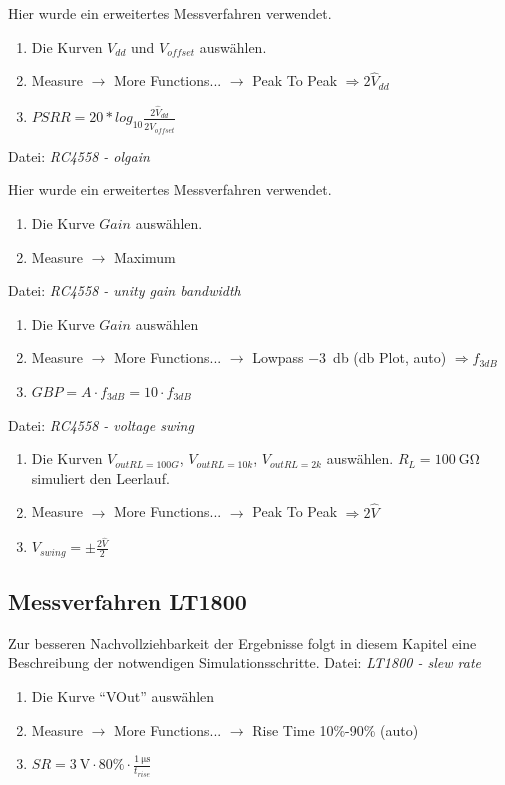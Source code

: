 \documentclass[
	ngerman,
	parskip=half,
	twocolumn,
	DIV=calc,
	]{scrartcl}
\begin{document}
	Hier wurde ein erweitertes Messverfahren \cite{website:amp_psrr_cmrr_circuits} verwendet.
	\begin{enumerate}
		\item Die Kurven $V_{dd}$ und $V_{offset}$ auswählen.
		\item Measure $\rightarrow$ More Functions... $\rightarrow$ Peak To Peak $\Rightarrow 2\hat{V}_{dd}$
		\item $ PSRR = 20 * log_{10} \frac{2\hat{V}_{dd}}{2\hat{V}_{offset}}$
	\end{enumerate}

	Datei: \emph{RC4558 - olgain}
	
	Hier wurde ein erweitertes Messverfahren \cite{website:amp_psrr_cmrr_circuits} verwendet.
	\begin{enumerate}
		\item Die Kurve $Gain$ auswählen.
		\item Measure $\rightarrow$ Maximum
	\end{enumerate}
	

	Datei: \emph{RC4558 - unity gain bandwidth}
	\begin{enumerate}
		\item Die Kurve $Gain$ auswählen
		\item Measure $\rightarrow$ More Functions... $\rightarrow$ Lowpass \SI{-3}{\decibel} (db Plot, auto) $\Rightarrow f_{3dB}$
		\item $ GBP = A \cdot f_{3dB} = 10 \cdot f_{3dB} $
	\end{enumerate}

	Datei: \emph{RC4558 - voltage swing}
	\begin{enumerate}
		\item Die Kurven $V_{out RL=100G}$, $V_{out RL=10k}$, $V_{out RL=2k}$ auswählen. $R_L=\SI{100}{\giga\ohm}$ simuliert den Leerlauf.
		\item Measure $\rightarrow$ More Functions... $\rightarrow$ Peak To Peak $\Rightarrow 2\hat{V}$
		\item $V_{swing} = \pm \frac{2\hat{V}}{2}$
	\end{enumerate}

	\subsection{Messverfahren LT1800}
	\label{sec:appendix_measurement_methods_LT1800}
	Zur besseren Nachvollziehbarkeit der Ergebnisse folgt in diesem Kapitel eine Beschreibung der notwendigen Simulationsschritte. 	
	Datei: \emph{LT1800 - slew rate}
	\begin{enumerate}
		\item Die Kurve \enquote{VOut} auswählen
		\item Measure $\rightarrow$ More Functions... $\rightarrow$ Rise Time 10\%-90\% (auto)
		\item $SR = \SI{3}{\volt} \cdot 80\% \cdot \frac{\SI{1}{\micro\second}}{t_{rise}}$
	\end{enumerate}
	
\end{document}
